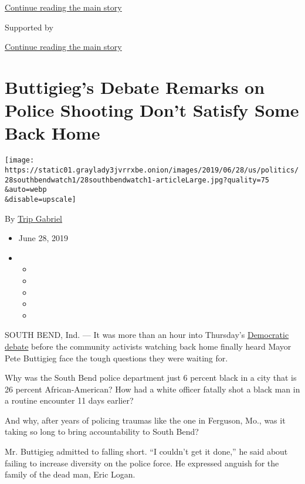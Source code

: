\protect\hyperlink{after-top}{Continue reading the main story}

Supported by

\protect\hyperlink{after-sponsor}{Continue reading the main story}

\hypertarget{buttigiegs-debate-remarks-on-police-shooting-dont-satisfy-some-back-home}{%
\section{Buttigieg's Debate Remarks on Police Shooting Don't Satisfy
Some Back
Home}\label{buttigiegs-debate-remarks-on-police-shooting-dont-satisfy-some-back-home}}

\texttt{[image: https://static01.graylady3jvrrxbe.onion/images/2019/06/28/us/politics/28southbendwatch1/28southbendwatch1-articleLarge.jpg?quality=75\\\&auto=webp\\\&disable=upscale]}

By \href{https://www.nytimes3xbfgragh.onion/by/trip-gabriel}{Trip
Gabriel}

\begin{itemize}
\item
  June 28, 2019
\item
  \begin{itemize}
  \item
  \item
  \item
  \item
  \item
  \end{itemize}
\end{itemize}

SOUTH BEND, Ind. --- It was more than an hour into Thursday's
\href{https://www.nytimes3xbfgragh.onion/2019/06/27/us/politics/democratic-debate-recap.html}{Democratic
debate} before the community activists watching back home finally heard
Mayor Pete Buttigieg face the tough questions they were waiting for.

Why was the South Bend police department just 6 percent black in a city
that is 26 percent African-American? How had a white officer fatally
shot a black man in a routine encounter 11 days earlier?

And why, after years of policing traumas like the one in Ferguson, Mo.,
was it taking so long to bring accountability to South Bend?

Mr. Buttigieg admitted to falling short. ``I couldn't get it done,'' he
said about failing to increase diversity on the police force. He
expressed anguish for the family of the dead man, Eric Logan.

